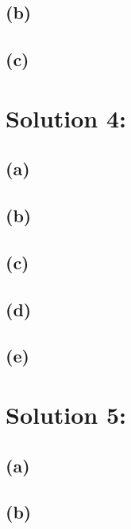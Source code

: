 \documentclass[10pt,a4paper]{article}
\begin{document}
  \subsection*{(b)}
  \subsection*{(c)}
\section*{Solution 4:}
  \subsection*{(a)}
  \subsection*{(b)}
  \subsection*{(c)}
  \subsection*{(d)}
  \subsection*{(e)}
\section*{Solution 5:}
  \subsection*{(a)}
  \subsection*{(b)}
\end{document}
